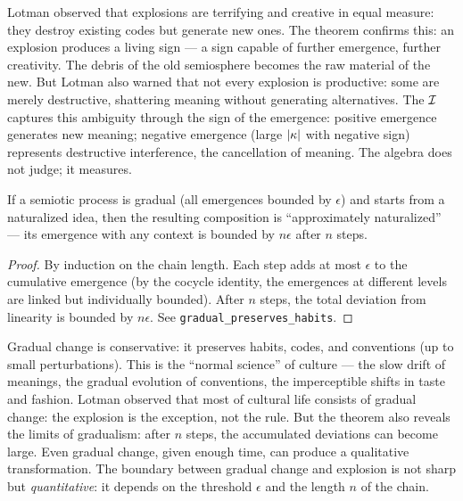 \begin{interpretation}
Lotman observed that explosions are terrifying and creative in equal
measure: they destroy existing codes but generate new ones. The
theorem confirms this: an explosion produces a living sign --- a sign
capable of further emergence, further creativity. The debris of the
old semiosphere becomes the raw material of the new. But Lotman also
warned that not every explosion is productive: some are merely
destructive, shattering meaning without generating alternatives.
The $\mathcal{I}$ captures this ambiguity through the sign of the emergence:
positive emergence generates new meaning; negative emergence (large
$|\kappa|$ with negative sign) represents destructive interference,
the cancellation of meaning. The algebra does not judge; it measures.
\end{interpretation}

\begin{theorem}
\label{thm:gradual-preserves}
If a semiotic process is gradual (all emergences bounded by $\epsilon$)
and starts from a naturalized idea, then the resulting composition
is ``approximately naturalized'' --- its emergence with any context
is bounded by $n\epsilon$ after $n$ steps.
\end{theorem}

\begin{proof}
By induction on the chain length. Each step adds at most $\epsilon$
to the cumulative emergence (by the cocycle identity, the emergences
at different levels are linked but individually bounded). After $n$
steps, the total deviation from linearity is bounded by $n\epsilon$.
See \texttt{gradual\_preserves\_habits}.
\end{proof}

\begin{interpretation}
Gradual change is conservative: it preserves habits, codes, and
conventions (up to small perturbations). This is the ``normal
science'' of culture --- the slow drift of meanings, the gradual
evolution of conventions, the imperceptible shifts in taste and
fashion. Lotman observed that most of cultural life consists of
gradual change: the explosion is the exception, not the rule. But
the theorem also reveals the limits of gradualism: after $n$ steps,
the accumulated deviations can become large. Even gradual change,
given enough time, can produce a qualitative transformation. The
boundary between gradual change and explosion is not sharp but
\emph{quantitative}: it depends on the threshold $\epsilon$ and
the length $n$ of the chain.
\end{interpretation}

